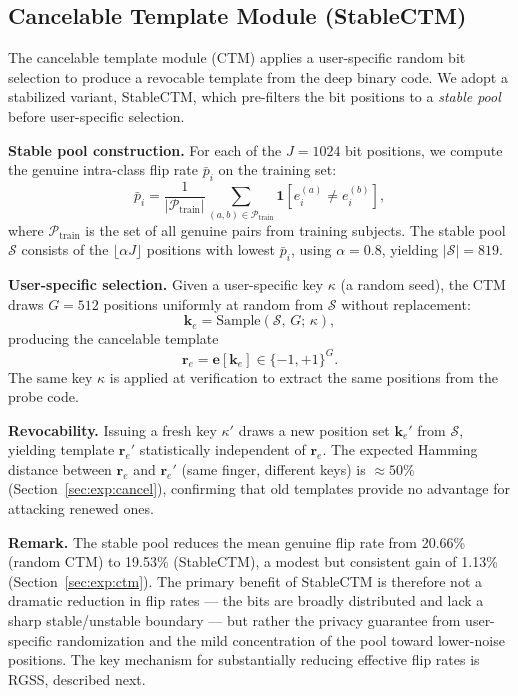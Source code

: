 \documentclass[journal]{IEEEtran}
\begin{document}
\subsection{Cancelable Template Module (StableCTM)}
\label{sec:method:ctm}

The cancelable template module (CTM) applies a user-specific random
bit selection to produce a revocable template from the deep binary
code.
We adopt a stabilized variant, StableCTM, which pre-filters the
bit positions to a \emph{stable pool} before user-specific selection.

\noindent\textbf{Stable pool construction.}
For each of the $J\!=\!1024$ bit positions, we compute the genuine
intra-class flip rate $\bar{p}_i$ on the training set:
\begin{equation}
  \bar{p}_i = \frac{1}{|\mathcal{P}_{\text{train}}|}
  \sum_{(a,b)\in\mathcal{P}_{\text{train}}}
  \mathbf{1}\!\left[e_i^{(a)} \neq e_i^{(b)}\right],
  \label{eq:fliprate}
\end{equation}
where $\mathcal{P}_{\text{train}}$ is the set of all genuine pairs
from training subjects.
The stable pool $\mathcal{S}$ consists of the
$\lfloor\alpha J\rfloor$ positions with lowest $\bar{p}_i$,
using $\alpha\!=\!0.8$, yielding $|\mathcal{S}|\!=\!819$.

\noindent\textbf{User-specific selection.}
Given a user-specific key $\kappa$ (a random seed), the CTM
draws $G\!=\!512$ positions uniformly at random from $\mathcal{S}$
without replacement:
\begin{equation}
  \mathbf{k}_e = \text{Sample}(\mathcal{S},\, G;\, \kappa),
  \label{eq:ctm_select}
\end{equation}
producing the cancelable template
\begin{equation}
  \mathbf{r}_e = \mathbf{e}[\mathbf{k}_e] \in \{-1,+1\}^G.
  \label{eq:cancelable}
\end{equation}
The same key $\kappa$ is applied at verification to extract the
same positions from the probe code.

\noindent\textbf{Revocability.}
Issuing a fresh key $\kappa'$ draws a new position set
$\mathbf{k}_{e}'$ from $\mathcal{S}$, yielding template
$\mathbf{r}_{e}'$ statistically independent of $\mathbf{r}_e$.
The expected Hamming distance between $\mathbf{r}_e$ and
$\mathbf{r}_{e}'$ (same finger, different keys) is $\approx\!50\%$
(Section~\ref{sec:exp:cancel}), confirming that old templates
provide no advantage for attacking renewed ones.

\noindent\textbf{Remark.}
The stable pool reduces the mean genuine flip rate from 20.66\%
(random CTM) to 19.53\% (StableCTM), a modest but consistent gain
of 1.13\% (Section~\ref{sec:exp:ctm}).
The primary benefit of StableCTM is therefore not a dramatic reduction
in flip rates — the bits are broadly distributed and lack a sharp
stable/unstable boundary — but rather the privacy guarantee from
user-specific randomization and the mild concentration of the pool
toward lower-noise positions.
The key mechanism for substantially reducing effective flip rates
is RGSS, described next.
\end{document}
